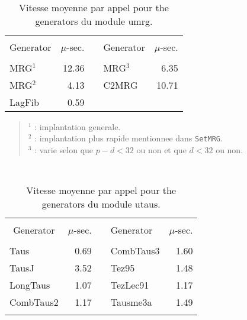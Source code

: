 \begin{table}[htb] \centering \tt
\caption {\rm Vitesse moyenne par appel pour the generators 
              du module umrg.}
\label {vitesse2}
\begin{tabular}{|l|r|c|l|r|}
\hline
&&&&\\
\multicolumn{1}{|c|}{\rm Generator} & $\mu$-sec. && {\rm Generator}
   & $\mu$-sec.\\
\hline \hline
&&&&\\
 MRG$^1$              &  12.36 && MRG$^3$      &   6.35\\
 MRG$^2$              &   4.13 && C2MRG        &  10.71\\
 LagFib               &   0.59 &&              &\\
\hline
\end{tabular}

\begin {verse}
 $^1$ : implantation generale.\\
 $^2$ : implantation plus rapide mentionnee dans {\tt SetMRG}.\\
 $^3$ : varie selon que $p - d < 32$ ou non et que $d < 32$ ou non.\\
\end {verse}
\end {table}


\begin{table}[htb] \centering \tt
\caption {\rm Vitesse moyenne par appel pour the generators du 
              module utaus.}
\label {vitesse3}
\begin{tabular}{|l|r|c|l|r|}
\hline
&&&&\\
\multicolumn{1}{|c|}{\rm Generator} & $\mu$-sec. && {\rm Generator}
   & $\mu$-sec.\\
\hline \hline
&&&&\\
 Taus                 &   0.69 && CombTaus3    &   1.60\\
 TausJ                &   3.52 && Tez95        &   1.48\\
 LongTaus             &   1.07 && TezLec91     &   1.17\\
 CombTaus2            &   1.17 && Tausme3a     &   1.49\\
&&&&\\
\hline
\end{tabular}

\end {table}

